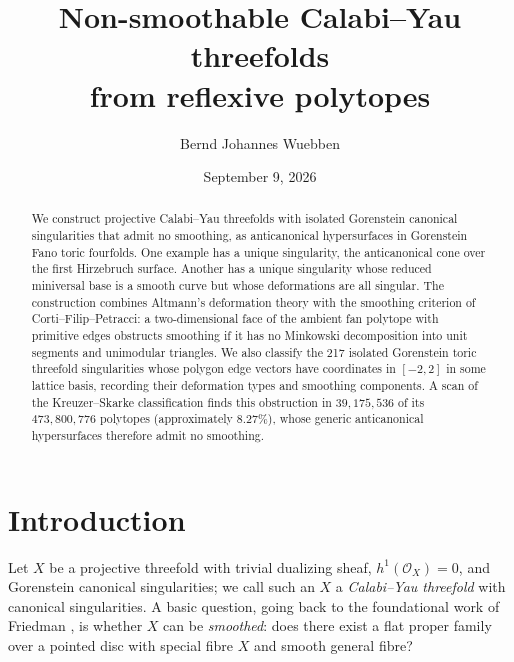 \documentclass[11pt]{amsart}
\title{Non-smoothable Calabi--Yau threefolds \\from reflexive polytopes}
\author{Bernd Johannes Wuebben}
\date{September 9, 2026}
\theoremstyle{definition}
\theoremstyle{remark}
\begin{document}
\begin{abstract}
We construct projective Calabi--Yau threefolds with isolated Gorenstein
canonical singularities that admit no smoothing, as anticanonical
hypersurfaces in Gorenstein Fano toric fourfolds. One example has a unique
singularity, the anticanonical cone over the first Hirzebruch surface.
Another has a unique singularity whose reduced miniversal base is a smooth
curve but whose deformations are all singular. The construction combines
Altmann's deformation theory with the smoothing criterion of
Corti--Filip--Petracci: a two-dimensional face of the ambient fan polytope with primitive edges
obstructs smoothing if it has no Minkowski decomposition into unit segments
and unimodular triangles. We also classify the 217 isolated Gorenstein
toric threefold singularities whose polygon edge vectors have coordinates
in $[-2,2]$ in some lattice basis, recording their deformation types and
smoothing components. A scan of the Kreuzer--Skarke classification
finds this obstruction in $39{,}175{,}536$ of its $473{,}800{,}776$
polytopes (approximately $8.27\%$), whose generic anticanonical
hypersurfaces therefore admit no smoothing.
\end{abstract}

\maketitle
\enlargethispage{5pt}

\section{Introduction}\label{sec:intro}

Let $X$ be a projective threefold with trivial dualizing sheaf,
$h^1(\mathcal{O}_X)=0$, and Gorenstein canonical singularities; we call such
an $X$ a \emph{Calabi--Yau threefold} with canonical singularities.  A basic question,
going back to the foundational work of Friedman \cite{Friedman86}, is whether
$X$ can be \emph{smoothed}: does there exist a flat proper family over a
pointed disc with special fibre $X$ and smooth general fibre?
\end{document}
